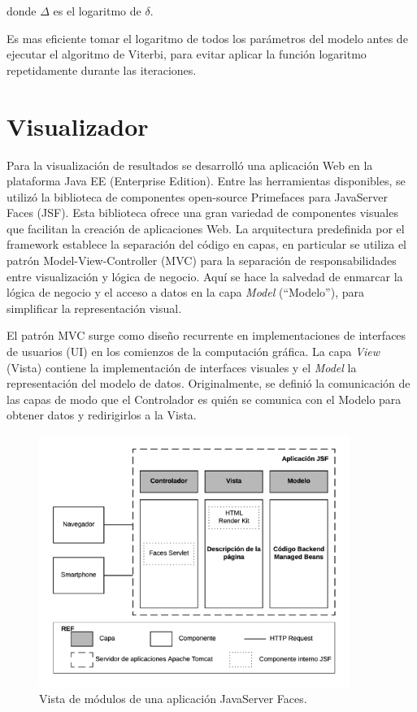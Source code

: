 donde $\Delta$ es el logaritmo de $\delta$.

Es mas eficiente tomar el logaritmo de todos los parámetros del modelo antes de ejecutar el algoritmo de Viterbi, para evitar aplicar la función logaritmo repetidamente durante las iteraciones.


\section{Visualizador}
Para la visualización de resultados se desarrolló una aplicación Web en la plataforma Java EE (Enterprise Edition). Entre las herramientas disponibles, se utilizó la biblioteca de componentes open-source Primefaces para JavaServer Faces (JSF). Esta biblioteca ofrece una gran variedad de componentes visuales que facilitan la creación de aplicaciones Web. La arquitectura predefinida por el framework establece la separación del código en capas, en particular se utiliza el patrón Model-View-Controller (MVC) para la separación de responsabilidades entre visualización y lógica de negocio. Aquí se hace la salvedad de enmarcar la lógica de negocio y el acceso a datos en la capa \textit{Model} (``Modelo''), para simplificar la representación visual. 

El patrón MVC surge como diseño recurrente en implementaciones de interfaces de usuarios (UI) en los comienzos de la computación gráfica. La capa \textit{View} (Vista) contiene la implementación de interfaces visuales y el \textit{Model}  la representación del modelo de datos. Originalmente, se definió la comunicación de las capas de modo que el Controlador es quién se comunica con el Modelo para obtener datos y redirigirlos a la Vista.

\begin{figure}[!htp]
	\centering
	\includegraphics[width=0.9\textwidth]{images/mvc-jsf.png}
	\captionsetup{width=0.9\textwidth}
	\caption{Vista de módulos de una aplicación JavaServer Faces.}
    \label{fig:mvc-jsf}
\end{figure}

